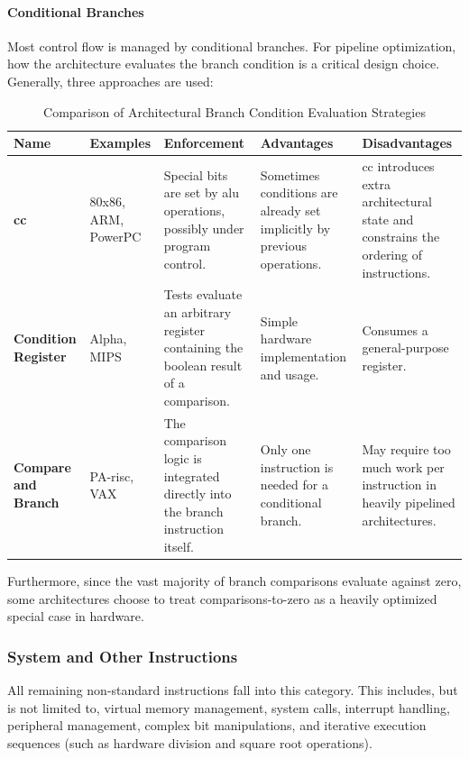 \paragraph{Conditional Branches}
Most control flow is managed by conditional branches. For pipeline optimization, how the architecture evaluates the branch condition is a critical design choice. Generally, three approaches are used:

\begin{table}[!htbp]
    \centering
    \renewcommand{\arraystretch}{1.3} 
    \begin{tabular}{| >{\raggedright\arraybackslash}p{} | >{\raggedright\arraybackslash}p{} | >{\raggedright\arraybackslash}p{} | >{\raggedright\arraybackslash}p{} | >{\raggedright\arraybackslash}p{} |}
         \hline
         \textbf{Name} & \textbf{Examples} & \textbf{Enforcement} & \textbf{Advantages} & \textbf{Disadvantages}\\
         \hline\hline
         \textbf{\gls{cc}} & 80x86, ARM, PowerPC & Special bits are set by \gls{alu} operations, possibly under program control. & Sometimes conditions are already set implicitly by previous operations. & \gls{cc} introduces extra architectural state and constrains the ordering of instructions.\\
         \hline
         \textbf{Condition Register} & Alpha, MIPS & Tests evaluate an arbitrary register containing the boolean result of a comparison. & Simple hardware implementation and usage. & Consumes a general-purpose register.\\
         \hline
         \textbf{Compare and Branch} & PA-\gls{risc}, VAX & The comparison logic is integrated directly into the branch instruction itself. & Only one instruction is needed for a conditional branch. & May require too much work per instruction in heavily pipelined architectures. \\
         \hline
    \end{tabular}
    \caption{Comparison of Architectural Branch Condition Evaluation Strategies}
    \label{tab:branch-strategies}
\end{table}

\noindent Furthermore, since the vast majority of branch comparisons evaluate against zero, some architectures choose to treat comparisons-to-zero as a heavily optimized special case in hardware.

\subsubsection{System and Other Instructions}
All remaining non-standard instructions fall into this category. This includes, but is not limited to, virtual memory management, system calls, interrupt handling, peripheral management, complex bit manipulations, and iterative execution sequences (such as hardware division and square root operations).

